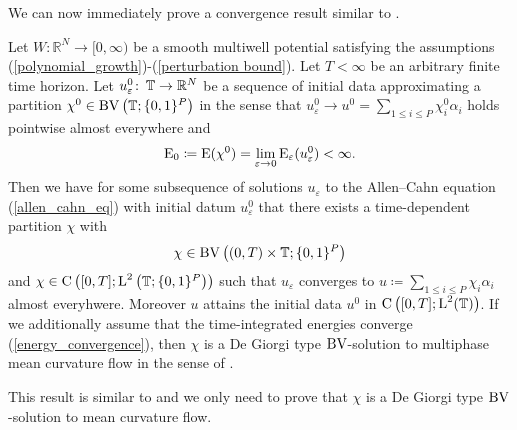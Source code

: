 We can now immediately prove a convergence result similar to
.
\begin{theorem}
	\label{convergence_to_de_giorgis_multiphase_mcf}
	Let $ W \colon \mathbb{ R }^{ N } \to [ 0, 
	\infty ) $ be a smooth multiwell potential satisfying the assumptions 
	(\ref{polynomial_growth})-(\ref{perturbation bound}). Let $ T < \infty 
	$ be an arbitrary finite time horizon. Let 
	$ u_{ \varepsilon }^{ 0 } \colon \operatorname{\mathbb{T}} \to \mathbb{ R }^{ N } $ be a 
	sequence of initial data
	approximating a partition 
	$ \chi^{ 0 } \in \operatorname{BV} \left( \operatorname{\mathbb{T}} ; \{ 0 , 1 \}^{ P } \right) $ 
	in the sense that 
	$ u_{ \varepsilon }^{ 0 } \to u^{ 0 } =  \sum_{ 1 \leq i \leq P } 
	\chi_{ i }^{ 0 } \alpha_{ i } $ 
	holds pointwise almost everywhere and 
	\begin{equation*} 
		\operatorname{E}_{ 0 } 
		\coloneqq 
		\operatorname{E} ( \chi^{ 0 } ) 
		= 
		\lim_{ \varepsilon \to 0 } 
		\operatorname{E}_{ \varepsilon } ( u_{ \varepsilon }^{ 0 } ) 
		< 
		\infty.
	\end{equation*}
	Then we have for 
	some subsequence of solutions $ u_{\varepsilon } $ to the Allen--Cahn 
	equation
	(\ref{allen_cahn_eq})  with initial datum $ u_{ 
		\varepsilon }^{ 0 } $ that there exists a time-dependent partition $ 
		\chi $ 
	with 
	\begin{equation*}
	\chi \in \operatorname{BV} \left( ( 0 , T ) \times \operatorname{\mathbb{T}} ; \{ 0 , 1 \}^{ P } 
	\right) 
	\end{equation*} and
	$ \chi 
	\in \operatorname{C} \left( [ 0 , T ] ; \operatorname{L}^{ 2 } \left( \operatorname{\mathbb{T}} ;  \{ 0 , 1 
	\}^{ P } \right) \right) $ such that $ u_{ \varepsilon } $ converges to 
	$ u \coloneqq \sum_{ 1 \leq i \leq P } \chi_{ i } \alpha_{ i } $ almost 
	everyhwere. Moreover $ u $ attains the initial data $ u^{ 0 } $ in $ 
	\operatorname{C} \left( [ 0, T ] ; \operatorname{L}^{ 2 }( \operatorname{\mathbb{T}} ) \right) $. If we 
	additionally assume that the 
	time-integrated energies converge (\ref{energy_convergence}), then $ 
	\chi $ is a De Giorgi type $ \operatorname{BV} $-solution to multiphase mean curvature 
	flow in the sense 
	of 
	.
\end{theorem} 

This result is similar to  and we only need 
to prove that $ \chi $ is a De Giorgi type $ \operatorname{BV} $-solution to mean curvature 
flow.

